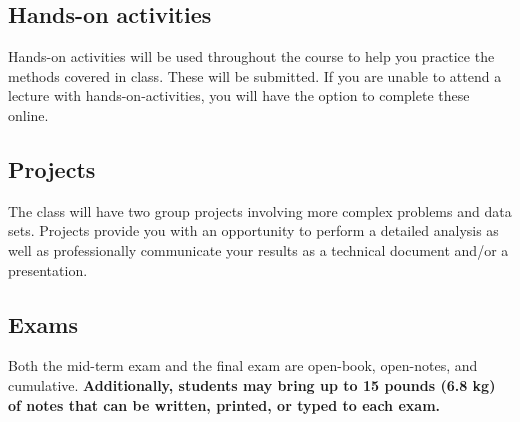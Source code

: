 \documentclass[11pt, a4paper]{article}
\begin{document}

\subsection*{Hands-on activities}
Hands-on activities will be used throughout the course to help you practice the methods covered in class. These will be submitted. 
If you are unable to attend a lecture with hands-on-activities, you will have the option to complete these online. 

\subsection*{Projects}
The class will have two group projects involving more complex problems and data sets. 
Projects provide you with an opportunity to perform a detailed analysis as well as professionally communicate your results as a technical document and/or a presentation.

\subsection*{Exams}

Both the mid-term exam and the final exam are open-book, open-notes, and cumulative. \textbf{Additionally, students may bring up to 15 pounds (6.8 kg) of notes that can be written, printed, or typed to each exam.} %


\end{document}
